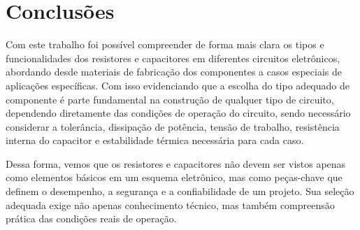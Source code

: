 \documentclass[12pt]{article}
\begin{document}
    \subsection{}
    \subsection{}
\section{Conclusões}

    Com este trabalho foi possível compreender de forma mais clara os tipos e funcionalidades dos resistores e capacitores em diferentes circuitos eletrônicos, abordando desde materiais de fabricação dos componentes a casos especiais de aplicações específicas. Com isso evidenciando que a escolha do tipo adequado de componente é parte fundamental na construção de qualquer tipo de circuito, dependendo diretamente das condições de operação do circuito, sendo necessário considerar a tolerância, dissipação de potência, tensão de trabalho, resistência interna do capacitor e estabilidade térmica necessária para cada caso.

    Dessa forma, vemos que os resistores e capacitores não devem ser vistos apenas como elementos básicos em um esquema eletrônico, mas como peças-chave que definem o desempenho, a segurança e a confiabilidade de um projeto. Sua seleção adequada exige não apenas conhecimento técnico, mas também compreensão prática das condições reais de operação.

\newpage


\end{document}
